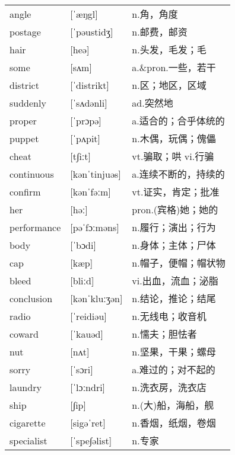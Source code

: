\documentclass[a4paper]{article}
\begin{document}
\section{}
\begin{tabular}{l l l}

angle & [ˈæŋgl] & n.角，角度 \\
postage & [ˈpəustidʒ] & n.邮费，邮资 \\
hair & [heə] & n.头发，毛发；毛 \\
some & [sʌm] & a.\&pron.一些，若干 \\
district & [ˈdistrikt] & n.区；地区，区域 \\
suddenly & [ˈsʌdənli] & ad.突然地 \\
proper & [ˈprɔpə] & a.适合的；合乎体统的 \\
puppet & [ˈpʌpit] & n.木偶，玩偶；傀儡 \\
cheat & [t∫iːt] & vt.骗取；哄 vi.行骗 \\
continuous & [kənˈtinjuəs] & a.连续不断的，持续的 \\
confirm & [kənˈfəːm] & vt.证实，肯定；批准 \\
her & [həː] & pron.(宾格)她；她的 \\
performance & [pəˈfɔːməns] & n.履行；演出；行为 \\
body & [ˈbɔdi] & n.身体；主体；尸体 \\
cap & [kæp] & n.帽子，便帽；帽状物 \\
bleed & [bliːd] & vi.出血，流血；泌脂 \\
conclusion & [kənˈkluːʒən] & n.结论，推论；结尾 \\
radio & [ˈreidiəu] & n.无线电；收音机 \\
coward & [ˈkauəd] & n.懦夫；胆怯者 \\
nut & [nʌt] & n.坚果，干果；螺母 \\
sorry & [ˈsɔri] & a.难过的；对不起的 \\
laundry & [ˈlɔːndri] & n.洗衣房，洗衣店 \\
ship & [∫ip] & n.(大)船，海船，舰 \\
cigarette & [sigəˈret] & n.香烟，纸烟，卷烟 \\
specialist & [ˈspe∫əlist] & n.专家 \\

\end{tabular}
\end{document}
